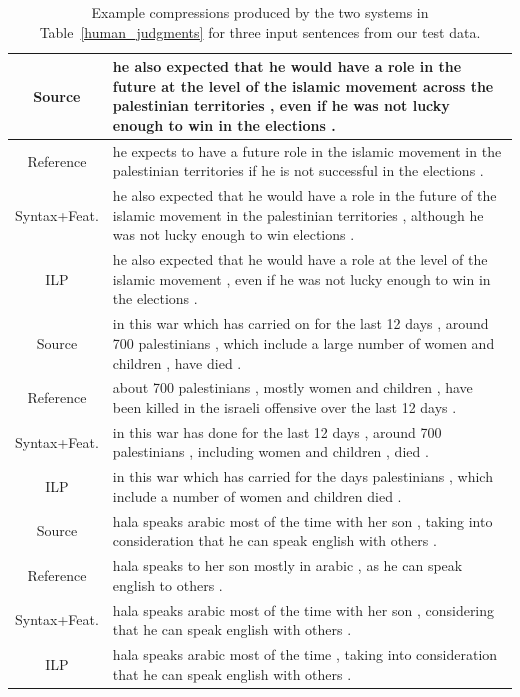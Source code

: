 \documentclass[11pt]{article}
\begin{document}
\begin{table}[!th]
\begin{center}
\small
{
\renewcommand{\arraystretch}{1.5}
\begin{tabular}{|c|>{\raggedright}m{13.2cm}|}
  \hline
  Source & he also expected that he would have a role in the future at
  the level of the islamic movement across the palestinian territories
  , even if he was not lucky enough to win in the elections .\tabularnewline
  \hline
  Reference & he expects to have a future role in the islamic movement
  in the palestinian territories if he is not successful in the
  elections .\tabularnewline
  \hline
  Syntax+Feat. & he also expected that he would have a role in the future
  of the islamic movement in the palestinian territories , although he
  was not lucky enough to win elections .\tabularnewline
  \hline
  ILP & he also expected that he would have a role at the level of the
  islamic movement , even if he was not lucky enough to win in the
  elections .\tabularnewline
  \hline
  \hline 
  Source & in this war which has carried on for the last 12 days ,
  around 700 palestinians , which include a large number of women and
  children , have died .\tabularnewline
  \hline
  Reference & about 700 palestinians , mostly women and children ,
  have been killed in the israeli offensive over the last 12 days .\tabularnewline
  \hline
  Syntax+Feat. & in this war has done for the last 12 days , around
  700 palestinians , including women and children , died .\tabularnewline
  \hline
  ILP & in this war which has carried for the days palestinians ,
  which include a number of women and children died .\tabularnewline
  \hline
  \hline
  Source & hala speaks arabic most of the time with her son , taking
  into consideration that he can speak english with others .\tabularnewline
  \hline
  Reference & hala speaks to her son mostly in arabic , as he can
  speak english to others .\tabularnewline
  \hline
  Syntax+Feat. & hala speaks arabic most of the time with her son ,
  considering that he can speak english with others .\tabularnewline
  \hline
  ILP & hala speaks arabic most of the time , taking into
  consideration that he can speak english with others .\tabularnewline
  \hline
\end{tabular}
}
\normalsize
\end{center}
\caption{Example compressions produced by the two systems in
  Table~\ref{human_judgments} for three input sentences from our test
  data.}
\label{test_examples}
\end{table}
\end{document}
